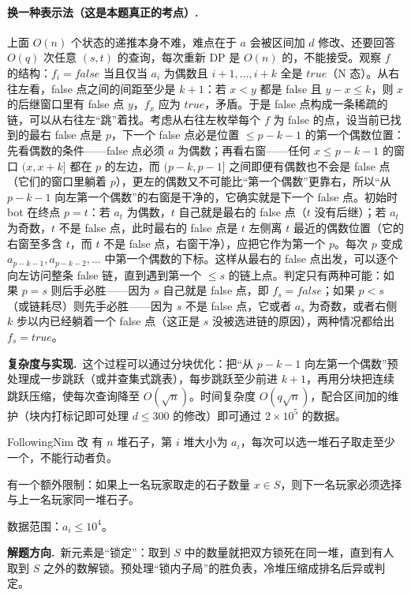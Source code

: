 \documentclass[UTF8,a4paper,11pt,oneside,openany,fontset=fandol]{ctexbook}
\theoremstyle{definition}
\newcommand{\hint}{\par\noindent\textbf{解题方向.}\ }
\newcommand{\cost}{\par\noindent\textbf{复杂度与实现.}\ }
\begin{document}
\paragraph{换一种表示法（这是本题真正的考点）.} 上面 $O(n)$ 个状态的递推本身不难，难点在于 $a$ 会被区间加 $d$ 修改、还要回答 $O(q)$ 次任意 $(s,t)$ 的查询，每次重新 DP 是 $O(n)$ 的，不能接受。观察 $f$ 的结构：$f_i=false$ 当且仅当 $a_i$ 为偶数且 $i+1,\ldots,i+k$ 全是 $true$（N 态）。从右往左看，false 点之间的间距至少是 $k+1$：若 $x<y$ 都是 false 且 $y-x\le k$，则 $x$ 的后继窗口里有 false 点 $y$，$f_x$ 应为 $true$，矛盾。于是 false 点构成一条稀疏的链，可以从右往左“跳”着找。考虑从右往左枚举每个 $f$ 为 false 的点，设当前已找到的最右 false 点是 $p$，下一个 false 点必是位置 $\le p-k-1$ 的第一个偶数位置：先看偶数的条件——false 点必须 $a$ 为偶数；再看右窗——任何 $x\le p-k-1$ 的窗口 $(x,x+k]$ 都在 $p$ 的左边，而 $(p-k,p-1]$ 之间即便有偶数也不会是 false 点（它们的窗口里躺着 $p$），更左的偶数又不可能比“第一个偶数”更靠右，所以“从 $p-k-1$ 向左第一个偶数”的右窗是干净的，它确实就是下一个 false 点。初始时 bot 在终点 $p=t$：若 $a_t$ 为偶数，$t$ 自己就是最右的 false 点（$t$ 没有后继）；若 $a_t$ 为奇数，$t$ 不是 false 点，此时最右的 false 点是 $t$ 左侧离 $t$ 最近的偶数位置（它的右窗至多含 $t$，而 $t$ 不是 false 点，右窗干净），应把它作为第一个 $p$。每次 $p$ 变成 $a_{p-k-1},a_{p-k-2},\ldots$ 中第一个偶数的下标。这样从最右的 false 点出发，可以逐个向左访问整条 false 链，直到遇到第一个 $\le s$ 的链上点。判定只有两种可能：如果 $p=s$ 则后手必胜——因为 $s$ 自己就是 false 点，即 $f_s=false$；如果 $p<s$（或链耗尽）则先手必胜——因为 $s$ 不是 false 点，它或者 $a_s$ 为奇数，或者右侧 $k$ 步以内已经躺着一个 false 点（这正是 $s$ 没被选进链的原因），两种情况都给出 $f_s=true$。

\cost 这个过程可以通过分块优化：把“从 $p-k-1$ 向左第一个偶数”预处理成一步跳跃（或并查集式跳表），每步跳跃至少前进 $k+1$，再用分块把连续跳跃压缩，使每次查询降至 $O(\sqrt n)$。时间复杂度 $O(q\sqrt n)$，配合区间加的维护（块内打标记即可处理 $d\le300$ 的修改）即可通过 $2\times10^{5}$ 的数据。

\begin{problem}{FollowingNim 改}
有 $n$ 堆石子，第 $i$ 堆大小为 $a_i$，每次可以选一堆石子取走至少一个，不能行动者负。

有一个额外限制：如果上一名玩家取走的石子数量 $x\in S$，则下一名玩家必须选择与上一名玩家同一堆石子。

数据范围：$a_i\le10^{4}$。
\end{problem}

\hint 新元素是“锁定”：取到 $S$ 中的数量就把双方锁死在同一堆，直到有人取到 $S$ 之外的数解锁。预处理“锁内子局”的胜负表，冷堆压缩成排名后异或判定。
\end{document}

